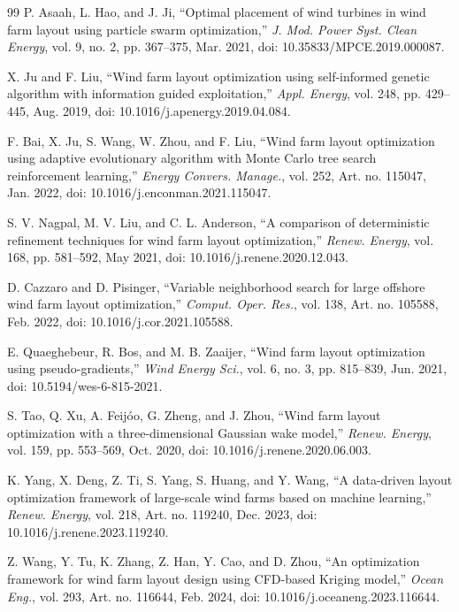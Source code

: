 \begin{thebibliography}{99}
P. Asaah, L. Hao, and J. Ji, ``Optimal placement of wind turbines in wind farm layout using particle swarm optimization,'' \textit{J. Mod. Power Syst. Clean Energy}, vol. 9, no. 2, pp. 367--375, Mar. 2021, doi: 10.35833/MPCE.2019.000087.

X. Ju and F. Liu, ``Wind farm layout optimization using self-informed genetic algorithm with information guided exploitation,'' \textit{Appl. Energy}, vol. 248, pp. 429--445, Aug. 2019, doi: 10.1016/j.apenergy.2019.04.084.

F. Bai, X. Ju, S. Wang, W. Zhou, and F. Liu, ``Wind farm layout optimization using adaptive evolutionary algorithm with Monte Carlo tree search reinforcement learning,'' \textit{Energy Convers. Manage.}, vol. 252, Art. no. 115047, Jan. 2022, doi: 10.1016/j.enconman.2021.115047.

S. V. Nagpal, M. V. Liu, and C. L. Anderson, ``A comparison of deterministic refinement techniques for wind farm layout optimization,'' \textit{Renew. Energy}, vol. 168, pp. 581--592, May 2021, doi: 10.1016/j.renene.2020.12.043.

D. Cazzaro and D. Pisinger, ``Variable neighborhood search for large offshore wind farm layout optimization,'' \textit{Comput. Oper. Res.}, vol. 138, Art. no. 105588, Feb. 2022, doi: 10.1016/j.cor.2021.105588.

E. Quaeghebeur, R. Bos, and M. B. Zaaijer, ``Wind farm layout optimization using pseudo-gradients,'' \textit{Wind Energy Sci.}, vol. 6, no. 3, pp. 815--839, Jun. 2021, doi: 10.5194/wes-6-815-2021.

S. Tao, Q. Xu, A. Feij\'oo, G. Zheng, and J. Zhou, ``Wind farm layout optimization with a three-dimensional Gaussian wake model,'' \textit{Renew. Energy}, vol. 159, pp. 553--569, Oct. 2020, doi: 10.1016/j.renene.2020.06.003.

K. Yang, X. Deng, Z. Ti, S. Yang, S. Huang, and Y. Wang, ``A data-driven layout optimization framework of large-scale wind farms based on machine learning,'' \textit{Renew. Energy}, vol. 218, Art. no. 119240, Dec. 2023, doi: 10.1016/j.renene.2023.119240.

Z. Wang, Y. Tu, K. Zhang, Z. Han, Y. Cao, and D. Zhou, ``An optimization framework for wind farm layout design using CFD-based Kriging model,'' \textit{Ocean Eng.}, vol. 293, Art. no. 116644, Feb. 2024, doi: 10.1016/j.oceaneng.2023.116644.


\end{thebibliography}
